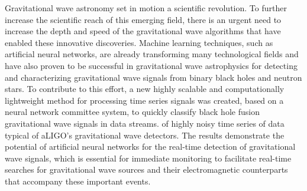 Gravitational wave astronomy set in motion a scientific revolution. To further increase the scientific reach of this emerging field, there is an urgent need to increase the depth and speed of the gravitational wave algorithms that have enabled these innovative discoveries. Machine learning techniques, such as artificial neural networks, are already transforming many technological fields and have also proven to be successful in gravitational wave astrophysics for detecting and characterizing gravitational wave signals from binary black holes and neutron stars. To contribute to this effort, a new highly scalable and computationally lightweight method for processing time series signals was created, based on a neural network committee system, to quickly classify black hole fusion gravitational wave signals in data streams. of highly noisy time series of data typical of aLIGO's gravitational wave detectors. The results demonstrate the potential of artificial neural networks for the real-time detection of gravitational wave signals, which is essential for immediate monitoring to facilitate real-time searches for gravitational wave sources and their electromagnetic counterparts that accompany these important events.



